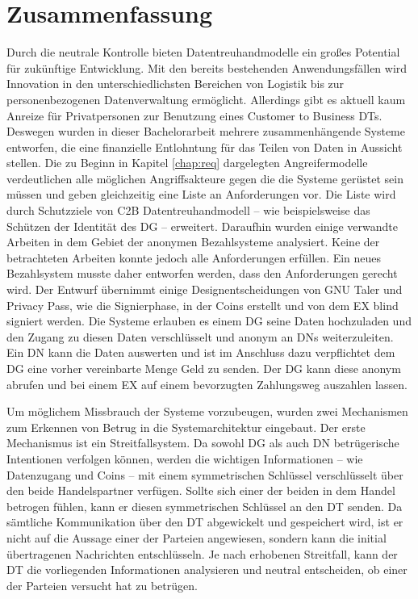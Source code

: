 \documentclass[
	fontsize=11pt,
	headings=small,
	parskip=half,           %
	bibliography=totoc,
	numbers=noenddot,       %
	open=any,               %
]{scrreprt}
\begin{document}
\chapter{Zusammenfassung}
Durch die neutrale Kontrolle bieten Datentreuhandmodelle ein großes Potential für zukünftige Entwicklung. Mit den bereits bestehenden Anwendungsfällen wird Innovation in den unterschiedlichsten Bereichen von Logistik bis zur personenbezogenen Datenverwaltung ermöglicht. Allerdings gibt es aktuell kaum Anreize für Privatpersonen zur Benutzung eines Customer to Business DTs. Deswegen wurden in dieser Bachelorarbeit mehrere zusammenhängende Systeme entworfen, die eine finanzielle Entlohntung für das Teilen von Daten in Aussicht stellen. Die zu Beginn in Kapitel \ref{chap:req} dargelegten Angreifermodelle verdeutlichen alle möglichen Angriffsakteure gegen die die Systeme gerüstet sein müssen und geben gleichzeitig eine Liste an Anforderungen vor. Die Liste wird durch Schutzziele von C2B Datentreuhandmodell -- wie beispielsweise das Schützen der Identität des DG -- erweitert. Daraufhin wurden einige verwandte Arbeiten in dem Gebiet der anonymen Bezahlsysteme analysiert. Keine der betrachteten Arbeiten konnte jedoch alle Anforderungen erfüllen. Ein neues Bezahlsystem musste daher entworfen werden, dass den Anforderungen gerecht wird. Der Entwurf übernimmt einige Designentscheidungen von GNU Taler und Privacy Pass, wie die Signierphase, in der Coins erstellt und von dem EX blind signiert werden. Die Systeme erlauben es einem DG seine Daten hochzuladen und den Zugang zu diesen Daten verschlüsselt und anonym an DNs weiterzuleiten. Ein DN kann die Daten auswerten und ist im Anschluss dazu verpflichtet dem DG eine vorher vereinbarte Menge Geld zu senden. Der DG kann diese anonym abrufen und bei einem EX auf einem bevorzugten Zahlungsweg auszahlen lassen.

Um möglichem Missbrauch der Systeme vorzubeugen, wurden zwei Mechanismen zum Erkennen von Betrug in die Systemarchitektur eingebaut. Der erste Mechanismus ist ein Streitfallsystem. Da sowohl DG als auch DN betrügerische Intentionen verfolgen können, werden die wichtigen Informationen -- wie Datenzugang und Coins -- mit einem symmetrischen Schlüssel verschlüsselt über den beide Handelspartner verfügen. Sollte sich einer der beiden in dem Handel betrogen fühlen, kann er diesen symmetrischen Schlüssel an den DT senden. Da sämtliche Kommunikation über den DT abgewickelt und gespeichert wird, ist er nicht auf die Aussage einer der Parteien angewiesen, sondern kann die initial übertragenen Nachrichten entschlüsseln. Je nach erhobenen Streitfall, kann der DT die vorliegenden Informationen analysieren und neutral entscheiden, ob einer der Parteien versucht hat zu betrügen.
\end{document}

